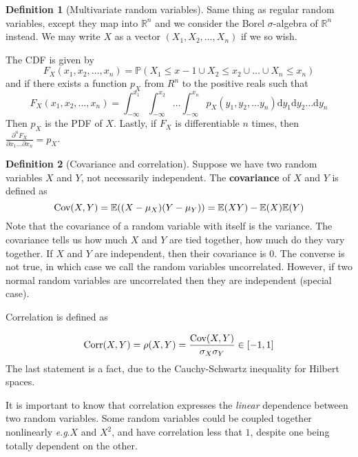 \documentclass{article}
\numberwithin{equation}{section}
\theoremstyle{definition}
\newtheorem{definition}{Definition}[section]
\newcommand{\R}{\mathbb{R}}
\newcommand{\pr}{\mathbb{P}}
\newcommand{\E}{\mathbb{E}}
\newcommand{\dm}{\mathrm{d}}
\newcommand{\cov}{\textup{Cov}}
\newcommand{\corr}{\textup{Corr}}
\newcommand{\eg}{\textit{e}.\textit{g}.}
\begin{document}
\begin{definition}[Multivariate random variables]
    Same thing as regular random variables, except they map into $\R^n$ and we consider the Borel $\sigma$-algebra of $\R^n$ instead. We may write $X$ as a vector $(X_1, X_2, \dots, X_n)$ if we so wish.

    The CDF is given by 
    \begin{equation}
        F_X(x_1, x_2, \dots, x_n) = \pr(X_1 \leq x-1 \cup X_2 \leq x_2 \cup \dots \cup X_n \leq x_n)
    \end{equation}
    and if there exists a function $p_X$ from $R^n$ to the positive reals such that
    \begin{equation}
        F_X(x_1, x_2, \dots, x_n) = \int_{-\infty}^{x_1} \int_{-\infty}^{x_2} \dots \int_{-\infty}^{x_n} p_X(y_1, y_2, \dots y_n) \dm y_1 \dm y_2 \dots \dm y_n
    \end{equation}
    Then $p_X$ is the PDF of $X$.
    Lastly, if $F_X$ is differentiable $n$ times, then $\frac{\partial^n F_X}{\partial x_1 \dots \partial x_n} = p_X$.
\end{definition}
\begin{definition}[Covariance and correlation]
    Suppose we have two random variables $X$ and $Y$, not necessarily independent. The \textbf{covariance} of $X$ and $Y$ is defined as
    \begin{equation}
        \cov(X,Y) = \E((X-\mu_X)(Y - \mu_Y)) = \E(XY) - \E(X)\E(Y)
    \end{equation}
    Note that the covariance of a random variable with itself is the variance. The covariance tells us how much $X$ and $Y$ are tied together, how much do they vary together. If $X$ and $Y$ are independent, then their covariance is $0$. The converse is not true, in which case we call the random variables uncorrelated. However, if two normal random variables are uncorrelated then they are independent (special case).

    Correlation is defined as

    \begin{equation}
        \corr(X,Y) = \rho(X,Y) = \frac{\cov(X,Y)}{\sigma_X \sigma_Y} \in [-1,1]
    \end{equation}
    The last statement is a fact, due to the Cauchy-Schwartz inequality for Hilbert spaces.
\end{definition}
It is important to know that correlation expresses the \textit{linear} dependence between two random variables. Some random variables could be coupled together nonlinearly \eg $X$ and $X^2$, and have correlation less that $1$, despite one being totally dependent on the other.
\end{document}
